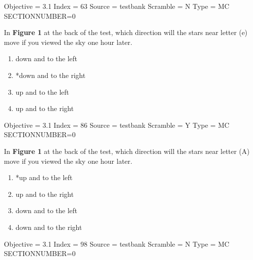 \documentclass[11pt]{article}
\begin{document}
\begin{enumerate}
\begin{minipage}{\textwidth}
\begin{minipage}{\textwidth}
Objective = 3.1
Index = 63
Source = testbank
Scramble = N
Type = MC
SECTIONNUMBER=0
\end{minipage}
\end{minipage}
\vskip 0.20in

\begin{minipage}{\textwidth}
\begin{minipage}{\textwidth}
\item In {\bf Figure 1} at the back of the test, which direction will the stars near letter (e) move if you viewed the sky one hour later.
\begin{multicols}{2}
\begin{enumerate} 
\setlength{\itemsep}{1pt} 
\setlength{\parskip}{0pt} 
\setlength{\parsep}{0pt}
\setlength{\multicolsep}{1pt} 
\item down and to the left
\item *down and to the right
\item up and to the left
\item up and to the right
\end{enumerate} 
\vfill 
\end{multicols}

Objective = 3.1
Index = 86
Source = testbank
Scramble = Y
Type = MC
SECTIONNUMBER=0
\end{minipage}
\end{minipage}
\vskip 0.20in

\begin{minipage}{\textwidth}
\begin{minipage}{\textwidth}
\item In {\bf Figure 1} at the back of the test, which direction will the stars near letter (A) move if you viewed the sky one hour later.
\begin{multicols}{2}
\begin{enumerate} 
\setlength{\itemsep}{1pt} 
\setlength{\parskip}{0pt} 
\setlength{\parsep}{0pt}
\setlength{\multicolsep}{1pt} 
\item *up and to the left
\item up and to the right
\item down and to the left
\item down and to the right
\end{enumerate} 
\vfill 
\end{multicols}

Objective = 3.1
Index = 98
Source = testbank
Scramble = N
Type = MC
SECTIONNUMBER=0
\end{minipage}
\end{minipage}
\vskip 0.20in


\end{enumerate}
\end{document}
